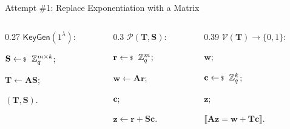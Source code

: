 \documentclass{zkdl-presentation-template}
\begin{document}
\begin{frame}{Attempt \#1: Replace Exponentiation with a Matrix}
        \vspace{5pt}
        \footnotesize
        \setlength{\fboxsep}{1.5pt}
        \begin{columns}[T]
            \begin{column}{0.27\textwidth}
                \colorbox{oc-blue-1}{$\mathsf{KeyGen}(1^{\lambda})$:}
                \begin{algoen}
                    \item \colorbox{oc-orange-1}{$\mathbf{S} \leftarrowS \mathbb{Z}_q^{m \times k}$};
                    \item \colorbox{oc-orange-1}{$\mathbf{T} \gets \mathbf{A}\mathbf{S}$};
                    \item {} $(\mathbf{T}, \mathbf{S})$.
                \end{algoen}
            \end{column}
            \begin{column}{0.3\textwidth}
                \colorbox{oc-blue-1}{$\mathcal{P}(\mathbf{T}, \mathbf{S})$:}
                \begin{algoen}
                    \item \colorbox{oc-orange-1}{$\mathbf{r} \leftarrowS \mathbb{Z}_q^m$};
                    \item {} \colorbox{oc-orange-1}{$\mathbf{w} \gets \mathbf{A}\mathbf{r}$};
                    \item {} $\mathbf{c}$;
                    \item {} \colorbox{oc-orange-1}{$\mathbf{z} \gets \mathbf{r} + \mathbf{S}\mathbf{c}$}.
                \end{algoen}
            \end{column}
            \begin{column}{0.39\textwidth}
                \colorbox{oc-blue-1}{$\mathcal{V}(\mathbf{T}) \to \{0,1\}$:}
                \begin{algoen}
                    \item {} $\mathbf{w}$;
                    \item {} \colorbox{oc-orange-1}{$\mathbf{c} \leftarrowS \mathbb{Z}_q^k$};
                    \item {} $\mathbf{z}$;
                    \item {} \colorbox{oc-orange-1}{$\llbracket \mathbf{A}\mathbf{z} = \mathbf{w} + \mathbf{T}\mathbf{c} \rrbracket$}.
                \end{algoen}
            \end{column}
        \end{columns}
        \normalsize
        \pause


\end{frame}
\end{document}
